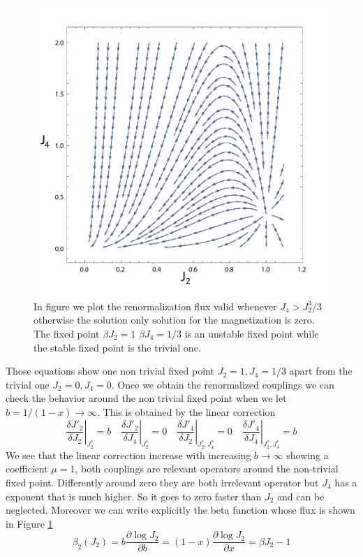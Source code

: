 \documentclass[aps,pre,noshowpacs]{revtex4}
\begin{document}
\begin{figure}[h]
\includegraphics[width=.5\columnwidth]{beta_lines.pdf}
\caption{In figure we plot the renormalization flux valid whenever $J_4>J_2^3/3$ otherwise the solution only solution for the magnetization is zero. The fixed point $\beta J_2=1$ $\beta J_4=1/3$ is an unstable fixed point while the stable fixed point is the trivial one.}
\label{beta functions}
\end{figure} 
Those equations show one non trivial fixed point $ J_2=1, J_4=1/3$ apart from the trivial one $J_2=0, J_4=0$. 
Once we obtain the renormalized couplings we can check the behavior around the non trivial fixed point when we let $b=1/(1-x)\to \infty$. This is obtained by the linear correction
$$\left.\frac{ \delta J'_2}{\delta J_2} \right |_{J_2^*}=b \quad \left.\frac{ \delta J'_2}{\delta J_4} \right |_{J_2^*}=0 \quad \left.\frac{ \delta J'_4}{\delta J_2} \right |_{J_2^*,J_4^*}=0 \quad \left.\frac{ \delta J'_4}{\delta J_4} \right |_{J_2^*,J_4^*}= b$$
We see that the linear correction increase with increasing $b\to \infty$ showing a coefficient $\mu =1$, both couplings are relevant operators around the non-trivial fixed point.
Differently around zero they are both irrelevant operator but $J_4$ has a exponent that is much higher. So it goes to zero faster than $J_2$ and can be neglected.
Moreover we can write explicitly the beta function whose flux is shown in Figure \ref{beta functions}
\begin{equation}\label{eq1:flux}
\beta_2(J_2) = b \frac{\partial \log J_2}{\partial b}= (1-x) \frac{\partial \log J_2}{\partial x} = \beta J_2 -1
\end{equation}
\end{document}
